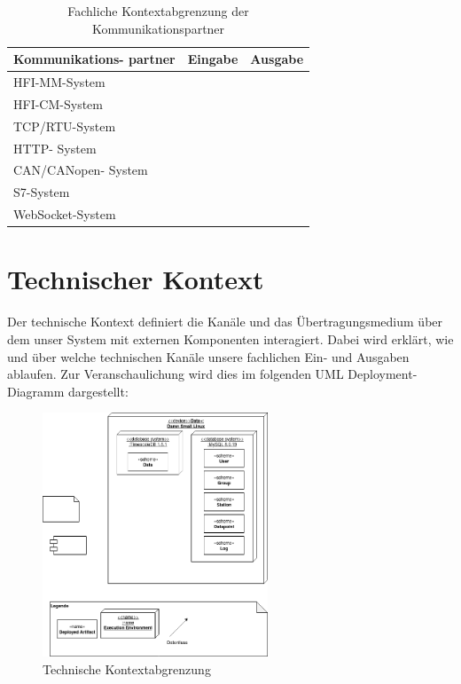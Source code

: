 \begin{table}[t]
	\begin{tabularx}{\textwidth}{|p{3cm}|X|X|}
		\hline
		Kommunikations-
		partner & Eingabe & Ausgabe \\
		\hline
		HFI-MM-System & & \\
		\hline
		HFI-CM-System & & \\
		\hline
		TCP/RTU-System & & \\
		\hline
		HTTP-
		System & & \\
		\hline
		CAN/CANopen-
		System & & \\
		\hline
		S7-System & & \\
		\hline
		WebSocket-System & & \\
		\hline
	\end{tabularx} 
	\caption{Fachliche Kontextabgrenzung der Kommunikationspartner}
	\label{tab:FachlicheKontextabgrenzungDerKommunikationspartner}
\end{table}

\section{Technischer Kontext}
Der technische Kontext definiert die Kanäle und das Übertragungsmedium über dem unser System mit externen Komponenten interagiert. Dabei wird erklärt, wie und über welche technischen Kanäle unsere fachlichen Ein- und Ausgaben ablaufen. Zur Veranschaulichung wird dies im folgenden UML Deployment-Diagramm dargestellt:

\begin{figure}[h]
	\centering
	\includegraphics[width=0.6\textwidth]{Graphics/technische_kontextabgrenzung.png}
	\caption{Technische Kontextabgrenzung}
	\label{fig:technische_kontextabgrenzung}
\end{figure}